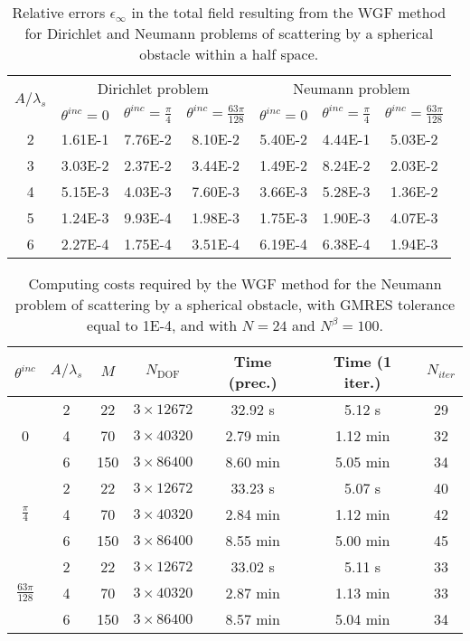 \documentclass[10pt]{article}
\numberwithin{equation}{section}
\begin{document}
\begin{table}[htbp]
\centering
\begin{tabular}{|c|c|c|c|c|c|c|}
\hline
\multirow{2}{*}{$A/\lambda_s$} & \multicolumn{3}{|c|}{Dirichlet problem}  & \multicolumn{3}{|c|}{Neumann problem}\\
\cline{2-7}
& $\theta^{inc}=0$ & $\theta^{inc}=\frac{\pi}{4}$ & $\theta^{inc}=\frac{63\pi}{128}$
& $\theta^{inc}=0$ & $\theta^{inc}=\frac{\pi}{4}$ & $\theta^{inc}=\frac{63\pi}{128}$  \\
\hline
2 & 1.61E-1 & 7.76E-2 & 8.10E-2 & 5.40E-2 & 4.44E-1 & 5.03E-2 \\
3 & 3.03E-2 & 2.37E-2 & 3.44E-2 & 1.49E-2 & 8.24E-2 & 2.03E-2 \\
4 & 5.15E-3 & 4.03E-3 & 7.60E-3 & 3.66E-3 & 5.28E-3 & 1.36E-2 \\
5 & 1.24E-3 & 9.93E-4 & 1.98E-3 & 1.75E-3 & 1.90E-3 & 4.07E-3 \\
6 & 2.27E-4 & 1.75E-4 & 3.51E-4 & 6.19E-4 & 6.38E-4 & 1.94E-3 \\
\hline
\end{tabular}
\caption{Relative errors $\epsilon_\infty$ in the total field  resulting from the  WGF method for Dirichlet and  Neumann problems of scattering by a spherical  obstacle within a half space. }
\label{Table3D.1}
\end{table}

\begin{table}[htbp]
\centering
\begin{tabular}{|c|c|c|c|c|c|c|}
\hline
$\theta^{inc}$ & $A/\lambda_s$ & $M$ & $N_{\mathrm{DOF}}$  & Time (prec.) & Time (1 iter.)& $N_{iter}$ \\
\hline
 & 2 & 22 & $3\times12672$ & 32.92 s & 5.12 s & 29 \\
0 & 4 & 70 & $3\times40320$ & 2.79 min & 1.12 min & 32 \\
 & 6 & 150 & $3\times86400$ & 8.60 min & 5.05 min & 34 \\
\hline
 & 2 & 22 & $3\times12672$ & 33.23 s & 5.07 s & 40 \\
$\frac{\pi}{4}$ & 4 & 70 & $3\times40320$ & 2.84 min & 1.12 min & 42 \\
 & 6 & 150 & $3\times86400$ & 8.55 min & 5.00 min & 45 \\
\hline
 & 2 & 22 & $3\times12672$ & 33.02 s & 5.11 s & 33 \\
$\frac{63\pi}{128}$ & 4 & 70 & $3\times40320$ & 2.87 min & 1.13 min & 33 \\
 & 6 & 150 & $3\times86400$ & 8.57 min & 5.04 min & 34 \\
\hline
\end{tabular}
  \caption{Computing costs required by the WGF method for the Neumann problem of scattering by a spherical obstacle, with GMRES tolerance equal to 1E-4, and with $N=24$ and $N^\beta=100$.}
\label{Table3D.2}
\end{table}
\end{document}
